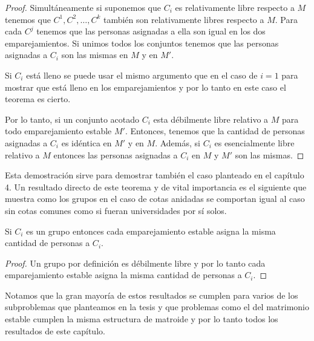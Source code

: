 \begin{proof}
Simultáneamente si suponemos que $C_i$ es relativamente libre respecto a $M$ tenemos que $C^1,C^2,\dots,C^k$ también son relativamente libres respecto a $M$. Para cada $C^j$ tenemos que las personas asignadas a ella son igual en los dos emparejamientos. Si unimos todos los conjuntos tenemos que las personas asignadas a $C_i$ son las mismas en $M$ y en $M'$. 

Si $C_i$ está lleno se puede usar el mismo argumento que en el caso de $i=1$ para mostrar que está lleno en los emparejamientos y por lo tanto en este caso el teorema es cierto. 

Por lo tanto, si un conjunto acotado $C_i$ esta débilmente libre relativo a $M$ para todo emparejamiento estable $M'$. Entonces, tenemos que la cantidad de personas asignadas a $C_i$ es idéntica en $M'$ y en $M$. Además, si $C_i$ es esencialmente libre relativo a $M$ entonces las personas asignadas a $C_i$ en $M$ y $M'$ son las mismas. 

\end{proof}

Esta demostración sirve para demostrar también el caso planteado en el capítulo 4. Un resultado directo de este teorema y de vital importancia es el siguiente que muestra como los grupos en el caso de cotas anidadas se comportan igual al caso sin cotas comunes como si fueran universidades por sí solos.

\begin{cor}
Si $C_i$ es un grupo entonces cada emparejamiento estable asigna la misma cantidad de personas a $C_i$.
\end{cor}

\begin{proof}
Un grupo por definición es débilmente libre y por lo tanto cada emparejamiento estable asigna la misma cantidad de personas a $C_i$.
\end{proof}

Notamos que la gran mayoría de estos resultados se cumplen para varios de los subproblemas que planteamos en la tesis y que problemas como el del matrimonio estable cumplen la misma estructura de matroide y por lo tanto todos los resultados de este capítulo.






